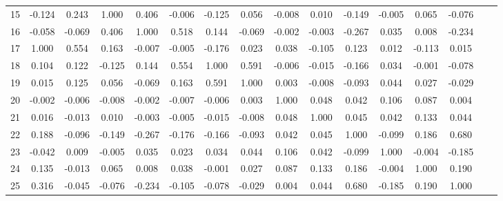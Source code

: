\documentclass[ %
                    author={Sam Phippen},
                supervisor={Dr. Rafal Bogacz},
                     title={Real time voice activity detectors in noisy personal computing environments},
                  subtitle={},
                    degree={MEng},
                      year={2012} ]{thesis}
\begin{document}
\begin{table}
\begin{tabular}{cccccccccccccccc}
        15 & -0.124 & 0.243  & 1.000  & 0.406  & -0.006 & -0.125 & 0.056  & -0.008 & 0.010  & -0.149 & -0.005 & 0.065  & -0.076 \\
        16 & -0.058 & -0.069 & 0.406  & 1.000  & 0.518  & 0.144  & -0.069 & -0.002 & -0.003 & -0.267 & 0.035  & 0.008  & -0.234 \\
        17 & 1.000  & 0.554  & 0.163  & -0.007 & -0.005 & -0.176 & 0.023  & 0.038  & -0.105 & 0.123  & 0.012  & -0.113 & 0.015\\
        18 & 0.104  & 0.122  & -0.125 & 0.144  & 0.554  & 1.000  & 0.591  & -0.006 & -0.015 & -0.166 & 0.034  & -0.001 & -0.078 \\
        19 & 0.015  & 0.125  & 0.056  & -0.069 & 0.163  & 0.591  & 1.000  & 0.003  & -0.008 & -0.093 & 0.044  & 0.027  & -0.029 \\
        20 & -0.002 & -0.006 & -0.008 & -0.002 & -0.007 & -0.006 & 0.003  & 1.000  & 0.048  & 0.042  & 0.106  & 0.087  & 0.004 \\
        21 & 0.016  & -0.013 & 0.010  & -0.003 & -0.005 & -0.015 & -0.008 & 0.048  & 1.000  & 0.045  & 0.042  & 0.133  & 0.044 \\
        22 & 0.188  & -0.096 & -0.149 & -0.267 & -0.176 & -0.166 & -0.093 & 0.042  & 0.045  & 1.000  & -0.099 & 0.186  & 0.680 \\
        23 & -0.042 & 0.009  & -0.005 & 0.035  & 0.023  & 0.034  & 0.044  & 0.106  & 0.042  & -0.099 & 1.000  & -0.004 & -0.185 \\
        24 & 0.135  & -0.013 & 0.065  & 0.008  & 0.038  & -0.001 & 0.027  & 0.087  & 0.133  & 0.186  & -0.004 & 1.000  & 0.190 \\
        25 & 0.316  & -0.045 & -0.076 & -0.234 & -0.105 & -0.078 & -0.029 & 0.004  & 0.044  & 0.680  & -0.185 & 0.190  & 1.000 \\
    \end{tabular}
\end{table}
\end{document}
